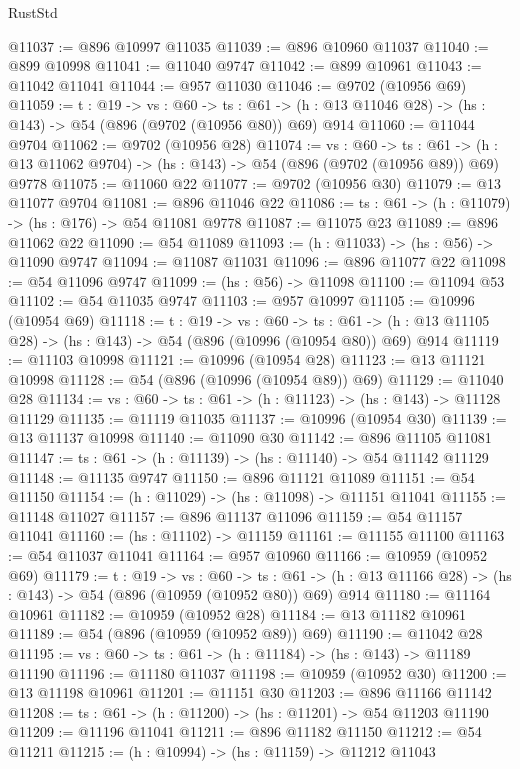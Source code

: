 \begin{lexlean}{RustStd}
\begin{coremodule}
@11037 := @896 @10997 @11035
@11039 := @896 @10960 @11037
@11040 := @899 @10998
@11041 := @11040 @9747
@11042 := @899 @10961
@11043 := @11042 @11041
@11044 := @957 @11030
@11046 := @9702 (@10956 @69)
@11059 := {t : @19} ->
  {vs : @60} ->
  {ts : @61} -> (h : @13 @11046 @28) -> (hs : @143) -> @54 (@896 (@9702 (@10956 @80)) @69) @914
@11060 := @11044 @9704
@11062 := @9702 (@10956 @28)
@11074 := {vs : @60} ->
  {ts : @61} -> (h : @13 @11062 @9704) -> (hs : @143) -> @54 (@896 (@9702 (@10956 @89)) @69) @9778
@11075 := @11060 @22
@11077 := @9702 (@10956 @30)
@11079 := @13 @11077 @9704
@11081 := @896 @11046 @22
@11086 := {ts : @61} -> (h : @11079) -> (hs : @176) -> @54 @11081 @9778
@11087 := @11075 @23
@11089 := @896 @11062 @22
@11090 := @54 @11089
@11093 := (h : @11033) -> (hs : @56) -> @11090 @9747
@11094 := @11087 @11031
@11096 := @896 @11077 @22
@11098 := @54 @11096 @9747
@11099 := (hs : @56) -> @11098
@11100 := @11094 @53
@11102 := @54 @11035 @9747
@11103 := @957 @10997
@11105 := @10996 (@10954 @69)
@11118 := {t : @19} ->
  {vs : @60} ->
  {ts : @61} -> (h : @13 @11105 @28) -> (hs : @143) -> @54 (@896 (@10996 (@10954 @80)) @69) @914
@11119 := @11103 @10998
@11121 := @10996 (@10954 @28)
@11123 := @13 @11121 @10998
@11128 := @54 (@896 (@10996 (@10954 @89)) @69)
@11129 := @11040 @28
@11134 := {vs : @60} -> {ts : @61} -> (h : @11123) -> (hs : @143) -> @11128 @11129
@11135 := @11119 @11035
@11137 := @10996 (@10954 @30)
@11139 := @13 @11137 @10998
@11140 := @11090 @30
@11142 := @896 @11105 @11081
@11147 := {ts : @61} -> (h : @11139) -> (hs : @11140) -> @54 @11142 @11129
@11148 := @11135 @9747
@11150 := @896 @11121 @11089
@11151 := @54 @11150
@11154 := (h : @11029) -> (hs : @11098) -> @11151 @11041
@11155 := @11148 @11027
@11157 := @896 @11137 @11096
@11159 := @54 @11157 @11041
@11160 := (hs : @11102) -> @11159
@11161 := @11155 @11100
@11163 := @54 @11037 @11041
@11164 := @957 @10960
@11166 := @10959 (@10952 @69)
@11179 := {t : @19} ->
  {vs : @60} ->
  {ts : @61} -> (h : @13 @11166 @28) -> (hs : @143) -> @54 (@896 (@10959 (@10952 @80)) @69) @914
@11180 := @11164 @10961
@11182 := @10959 (@10952 @28)
@11184 := @13 @11182 @10961
@11189 := @54 (@896 (@10959 (@10952 @89)) @69)
@11190 := @11042 @28
@11195 := {vs : @60} -> {ts : @61} -> (h : @11184) -> (hs : @143) -> @11189 @11190
@11196 := @11180 @11037
@11198 := @10959 (@10952 @30)
@11200 := @13 @11198 @10961
@11201 := @11151 @30
@11203 := @896 @11166 @11142
@11208 := {ts : @61} -> (h : @11200) -> (hs : @11201) -> @54 @11203 @11190
@11209 := @11196 @11041
@11211 := @896 @11182 @11150
@11212 := @54 @11211
@11215 := (h : @10994) -> (hs : @11159) -> @11212 @11043

\end{coremodule}
\end{lexlean}
